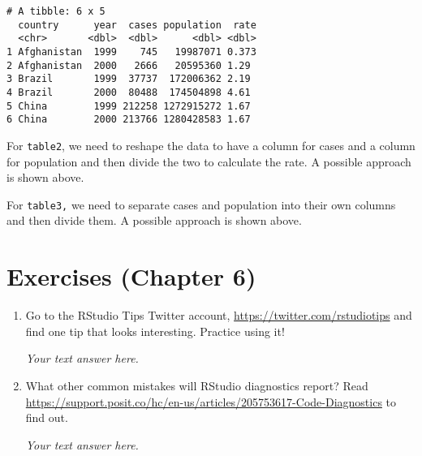 \documentclass[
  letterpaper,
  DIV=11,
  numbers=noendperiod]{scrreprt}
\begin{document}
\begin{enumerate}
\begin{tcolorbox}
\begin{verbatim}
# A tibble: 6 x 5
  country      year  cases population  rate
  <chr>       <dbl>  <dbl>      <dbl> <dbl>
1 Afghanistan  1999    745   19987071 0.373
2 Afghanistan  2000   2666   20595360 1.29 
3 Brazil       1999  37737  172006362 2.19 
4 Brazil       2000  80488  174504898 4.61 
5 China        1999 212258 1272915272 1.67 
6 China        2000 213766 1280428583 1.67 
\end{verbatim}

  For \texttt{table2}, we need to reshape the data to have a column for
  cases and a column for population and then divide the two to calculate
  the rate. A possible approach is shown above.

  For \texttt{table3,} we need to separate cases and population into
  their own columns and then divide them. A possible approach is shown
  above.

  \end{tcolorbox}
\end{enumerate}


\hypertarget{exercises-chapter-6}{%
\chapter{Exercises (Chapter 6)}\label{exercises-chapter-6}}

\begin{enumerate}
\def\labelenumi{\arabic{enumi}.}
\item
  Go to the RStudio Tips Twitter account,
  \url{https://twitter.com/rstudiotips} and find one tip that looks
  interesting. Practice using it!

  \begin{tcolorbox}[enhanced jigsaw, left=2mm, rightrule=.15mm, bottomtitle=1mm, opacitybacktitle=0.6, leftrule=.75mm, opacityback=0, colframe=quarto-callout-note-color-frame, bottomrule=.15mm, coltitle=black, toptitle=1mm, colback=white, titlerule=0mm, colbacktitle=quarto-callout-note-color!10!white, title={Answer}, toprule=.15mm, breakable, arc=.35mm]

  \emph{Your text answer here.}

  \end{tcolorbox}
\item
  What other common mistakes will RStudio diagnostics report? Read
  \url{https://support.posit.co/hc/en-us/articles/205753617-Code-Diagnostics}
  to find out.

  \begin{tcolorbox}[enhanced jigsaw, left=2mm, rightrule=.15mm, bottomtitle=1mm, opacitybacktitle=0.6, leftrule=.75mm, opacityback=0, colframe=quarto-callout-note-color-frame, bottomrule=.15mm, coltitle=black, toptitle=1mm, colback=white, titlerule=0mm, colbacktitle=quarto-callout-note-color!10!white, title={Answer}, toprule=.15mm, breakable, arc=.35mm]

  \emph{Your text answer here.}

  \end{tcolorbox}
\end{enumerate}
\end{document}

